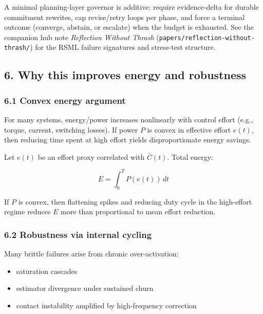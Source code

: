 \documentclass[11pt]{article}
\providecommand{\tightlist}{%
  \setlength{\itemsep}{0pt}\setlength{\parskip}{0pt}}
\begin{document}
A minimal planning-layer governor is additive: require evidence-delta for durable commitment rewrites, cap revise/retry loops per phase, and force a terminal outcome (converge, abstain, or escalate) when the budget is exhausted. See the companion hub note \emph{Reflection Without Thrash} (\texttt{papers/reflection-without-thrash/}) for the RSML failure signatures and stress-test structure.

\hypertarget{why-this-improves-energy-and-robustness}{%
\subsection{6. Why this improves energy and robustness}\label{why-this-improves-energy-and-robustness}}

\hypertarget{convex-energy-argument}{%
\subsubsection{6.1 Convex energy argument}\label{convex-energy-argument}}

For many systems, energy/power increases nonlinearly with control effort (e.g., torque, current, switching losses). If power \(P\) is convex in effective effort \(e(t)\), then reducing time spent at high effort yields disproportionate energy savings.

Let \(e(t)\) be an effort proxy correlated with \(\bar C(t)\). Total energy:

\[
E = \int_0^T P(e(t))\,dt
\]

If \(P\) is convex, then flattening spikes and reducing duty cycle in the high-effort regime reduces \(E\) more than proportional to mean effort reduction.

\hypertarget{robustness-via-internal-cycling}{%
\subsubsection{6.2 Robustness via internal cycling}\label{robustness-via-internal-cycling}}

Many brittle failures arise from chronic over-activation:

\begin{itemize}
\tightlist
\item
  saturation cascades
\item
  estimator divergence under sustained churn
\item
  contact instability amplified by high-frequency correction
\end{itemize}
\end{document}

